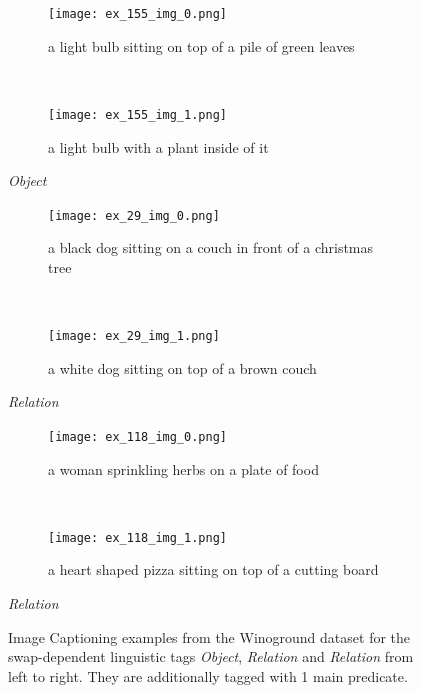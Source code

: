 \begin{figure}[ht]
\centering
    \begin{minipage}[t]{.30\textwidth}
        \begin{subfigure}[t]{\textwidth}
        \centering
        \texttt{[image: ex\_155\_img\_0.png]}
        \caption{a light bulb sitting on top of a pile of green leaves}
        \end{subfigure}\\
        \begin{subfigure}[t]{\textwidth}
        \centering
        \texttt{[image: ex\_155\_img\_1.png]}
        \caption{a light bulb with a plant inside of it}
        \end{subfigure}%
        \caption*{\textit{Object}}
    \end{minipage}
    \hfill
    \begin{minipage}[t]{.30\textwidth}
        \begin{subfigure}[t]{\textwidth}
        \centering
        \texttt{[image: ex\_29\_img\_0.png]}
        \caption{a black dog sitting on a couch in front of a christmas tree}
        \end{subfigure}\\
        \begin{subfigure}[t]{\textwidth}
        \centering
        \texttt{[image: ex\_29\_img\_1.png]}
        \caption{a white dog sitting on top of a brown couch}
        \end{subfigure}%
        \caption*{\textit{Relation}}
    \end{minipage}
    \hfill
    \begin{minipage}[t]{.30\textwidth}
        \begin{subfigure}[t]{\textwidth}
        \centering
        \texttt{[image: ex\_118\_img\_0.png]}
        \caption{a woman sprinkling herbs on a plate of food}
        \end{subfigure}\\
        \begin{subfigure}[t]{\textwidth}
        \centering
        \texttt{[image: ex\_118\_img\_1.png]}
        \caption{a heart shaped pizza sitting on top of a cutting board}
        \end{subfigure}%
        \caption*{\textit{Relation}}
    \end{minipage}%
    \caption{Image Captioning examples from the Winoground dataset for the swap-dependent linguistic tags \textit{Object}, \textit{Relation} and \textit{Relation} from left to right. They are additionally tagged with 1 main predicate.}
    \label{fig:captioning-examples}
\end{figure}

